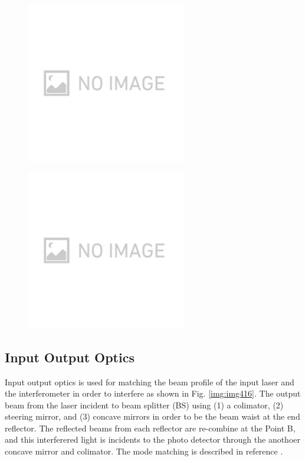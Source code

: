 \begin{figure}[p]
  \begin{minipage}[b]{7cm}
    \begin{center}   
      \includegraphics[width=7cm]{./img.png}
      \label{img:img418}
    \end{center}
  \end{minipage}\hspace{0.1cm}
  \begin{minipage}[b]{7cm}
    \begin{center}   
      \includegraphics[width=7cm]{./img.png}      
      \label{img:img419}
    \end{center}
  \end{minipage}
  \caption{}  
\end{figure}


\subsection{Input Output Optics}
Input output optics is used for matching the beam profile of the input laser and the interferometer in order to interfere as shown in Fig. \ref{img:img416}. The output beam from the laser incident to beam splitter (BS) using (1) a colimator, (2) steering mirror, and (3) concave mirrors in order to be the beam waist at the end reflector. The reflected beams from each reflector are re-combine at the Point B, and this interferered light is incidents to the photo detector through the anothoer concave mirror and colimator. The mode matching is described in reference \cite{miyo2017baseline}.


